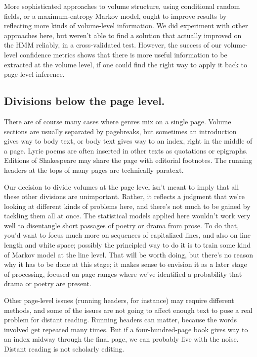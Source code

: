 \documentclass[paper=a4, fontsize=12pt]{scrartcl}
\numberwithin{equation}{section}		%
\numberwithin{figure}{section}			%
\numberwithin{table}{section}				%
\begin{document}
More sophisticated approaches to volume structure, using conditional random fields, or a maximum-entropy Markov model, ought to improve results by reflecting more kinds of volume-level information. We did experiment with other approaches here, but weren't able to find a solution that actually improved on the HMM reliably, in a cross-validated test. However, the success of our volume-level confidence metrics shows that there is more useful information to be extracted at the volume level, if one could find the right way to apply it back to page-level inference.

\subsection{Divisions below the page level.}

There are of course many cases where genres mix on a single page. Volume sections are usually separated by pagebreaks, but sometimes an introduction gives way to body text, or body text gives way to an index, right in the middle of a page. Lyric poems are often inserted in other texts as quotations or epigraphs. Editions of Shakespeare may share the page with editorial footnotes. The running headers at the tops of many pages are technically paratext.

Our decision to divide volumes at the page level isn't meant to imply that all these other divisions are unimportant. Rather, it reflects a judgment that we're looking at different kinds of problems here, and there's not much to be gained by tackling them all at once. The statistical models applied here wouldn't work very well to disentangle short passages of poetry or drama from prose. To do that, you'd want to focus much more on sequences of capitalized lines, and also on line length and white space; possibly the principled way to do it is to train some kind of Markov model at the line level. That will be worth doing, but there's no reason why it has to be done at this stage; it makes sense to envision it as a later stage of processing, focused on page ranges where we've identified a probability that drama or poetry are present.

Other page-level issues (running headers, for instance) may require different methods, and some of the issues are not going to affect enough text to pose a real problem for distant reading. Running headers can matter, because the words involved get repeated many times. But if a four-hundred-page book gives way to an index midway through the final page, we can probably live with the noise. Distant reading is not scholarly editing.
\end{document}
